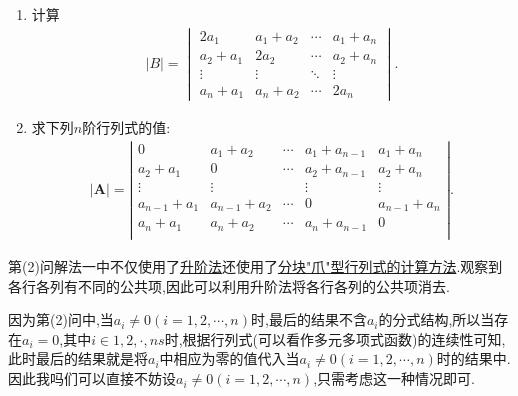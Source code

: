 \documentclass[../../main.tex]{subfiles}
\begin{document}
\begin{example}
\begin{enumerate}[(1)]
\item 计算
\begin{align*}
|B| = 
\begin{vmatrix}
2a_1 & a_1 + a_2 & \cdots & a_1 + a_n \\
a_2 + a_1 & 2a_2 & \cdots & a_2 + a_n \\
\vdots & \vdots & \ddots & \vdots \\
a_n + a_1 & a_n + a_2 & \cdots & 2a_n
\end{vmatrix}.
\end{align*}

\item 求下列$n$阶行列式的值:
\begin{align*}
|\boldsymbol{A}|=\left| \begin{matrix}
0&		a_1+a_2&		\cdots&		a_1+a_{n-1}&		a_1+a_n\\
a_2+a_1&		0&		\cdots&		a_2+a_{n-1}&		a_2+a_n\\
\vdots&		\vdots&		&		\vdots&		\vdots\\
a_{n-1}+a_1&		a_{n-1}+a_2&		\cdots&		0&		a_{n-1}+a_n\\
a_n+a_1&		a_n+a_2&		\cdots&		a_n+a_{n-1}&		0\\
\end{matrix} \right|.
\end{align*}
\end{enumerate}
\end{example}
\begin{note}
第(2)问{\color{blue}解法一}中不仅使用了\hyperlink{行列式计算:升阶法}{升阶法}还使用了\hyperref[proposition:分块"爪"型行列式]{分块"爪"型行列式的计算方法}.观察到各行各列有不同的公共项,因此可以利用升阶法将各行各列的公共项消去.
\end{note}
\begin{remark}
因为第(2)问中,当$a_i\ne 0(i=1,2,\cdots,n)$时,最后的结果不含$a_i$的分式结构,所以当存在$a_i=0$,其中$i\in{1,2,\cdot,ns}$时,根据行列式(可以看作多元多项式函数)的连续性可知,此时最后的结果就是将$a_i$中相应为零的值代入当$a_i\ne 0(i=1,2,\cdots,n)$时的结果中.因此我吗们可以直接不妨设$a_i\ne 0(i=1,2,\cdots,n)$,只需考虑这一种情况即可.
\end{remark}
\end{document}
